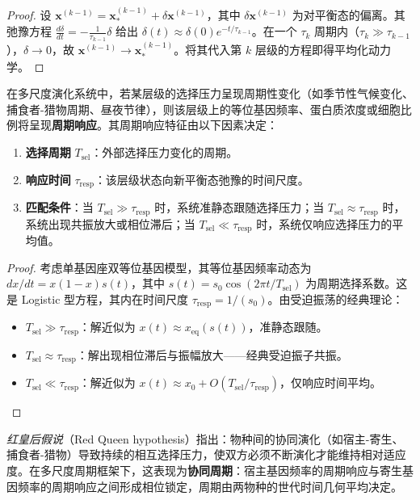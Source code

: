 \begin{proof}
设 $\mathbf{x}^{(k-1)} = \mathbf{x}^{(k-1)}_* + \delta \mathbf{x}^{(k-1)}$，其中 $\delta \mathbf{x}^{(k-1)}$ 为对平衡态的偏离。其弛豫方程 $\frac{d\delta}{dt} = -\frac{1}{\tau_{k-1}}\delta$ 给出 $\delta(t) \approx \delta(0) e^{-t/\tau_{k-1}}$。在一个 $\tau_k$ 周期内（$\tau_k \gg \tau_{k-1}$），$\delta \to 0$，故 $\mathbf{x}^{(k-1)} \to \mathbf{x}^{(k-1)}_*$。将其代入第 $k$ 层级的方程即得平均化动力学。
\end{proof}

\begin{theorem}[多尺度选择的周期结构]\label{thm:multi_scale_selection_periodicity}
在多尺度演化系统中，若某层级的选择压力呈现周期性变化（如季节性气候变化、捕食者-猎物周期、昼夜节律），则该层级上的等位基因频率、蛋白质浓度或细胞比例将呈现\textbf{周期响应}。其周期响应特征由以下因素决定：
\begin{enumerate}[label=(\roman*)]
    \item \textbf{选择周期} $T_{\text{sel}}$：外部选择压力变化的周期。
    \item \textbf{响应时间} $\tau_{\text{resp}}$：该层级状态向新平衡态弛豫的时间尺度。
    \item \textbf{匹配条件}：当 $T_{\text{sel}} \gg \tau_{\text{resp}}$ 时，系统准静态跟随选择压力；当 $T_{\text{sel}} \approx \tau_{\text{resp}}$ 时，系统出现共振放大或相位滞后；当 $T_{\text{sel}} \ll \tau_{\text{resp}}$ 时，系统仅响应选择压力的平均值。
\end{enumerate}
\end{theorem}

\begin{proof}
考虑单基因座双等位基因模型，其等位基因频率动态为 $dx/dt = x(1-x) s(t)$，其中 $s(t) = s_0 \cos(2\pi t/T_{\text{sel}})$ 为周期选择系数。这是 Logistic 型方程，其内在时间尺度 $\tau_{\text{resp}} = 1/(s_0)$。由受迫振荡的经典理论：
\begin{itemize}
\item $T_{\text{sel}} \gg \tau_{\text{resp}}$：解近似为 $x(t) \approx x_{\text{eq}}(s(t))$，准静态跟随。
\item $T_{\text{sel}} \approx \tau_{\text{resp}}$：解出现相位滞后与振幅放大——经典受迫振子共振。
\item $T_{\text{sel}} \ll \tau_{\text{resp}}$：解近似为 $x(t) \approx x_0 + O(T_{\text{sel}}/\tau_{\text{resp}})$，仅响应时间平均。
\end{itemize}
\end{proof}

\begin{corollary}[红皇后假说的周期结构]\label{cor:red_queen}
\emph{红皇后假说}（Red Queen hypothesis）指出：物种间的协同演化（如宿主-寄生、捕食者-猎物）导致持续的相互选择压力，使双方必须不断演化才能维持相对适应度。在多尺度周期框架下，这表现为\textbf{协同周期}：宿主基因频率的周期响应与寄生基因频率的周期响应之间形成相位锁定，周期由两物种的世代时间几何平均决定。
\end{corollary}

